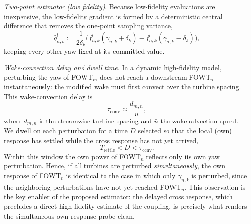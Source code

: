 \emph{Two-point estimator (low fidelity).} Because low-fidelity evaluations are inexpensive, the low-fidelity gradient is formed by a deterministic central difference that removes the one-point sampling variance,
\begin{equation} \label{eq:two-point}
    \hat{g}^{l}_{n,k} := \frac{1}{2\delta_k}\Big( f^{l}_{n,k}(\gamma_{n,k}+\delta_k) - f^{l}_{n,k}(\gamma_{n,k}-\delta_k) \Big),
\end{equation}
keeping every other yaw fixed at its committed value.

\emph{Wake-convection delay and dwell time.} In a dynamic high-fidelity model, perturbing the yaw of FOWT$_m$ does not reach a downstream FOWT$_n$ instantaneously: the modified wake must first convect over the turbine spacing. This wake-convection delay is
\begin{equation} \label{eq:tau-conv}
    \tau_{\text{conv}} \approx \frac{d_{m,n}}{\bar{u}},
\end{equation}
where $d_{m,n}$ is the streamwise turbine spacing and $\bar{u}$ the wake-advection speed. We dwell on each perturbation for a time $D$ selected so that the local (own) response has settled while the cross response has not yet arrived,
\begin{equation} \label{eq:dwell}
    T_{\text{settle}} < D < \tau_{\text{conv}}.
\end{equation}
Within this window the own power of FOWT$_n$ reflects only its own yaw perturbation. Hence, if all turbines are perturbed \emph{simultaneously}, the own response of FOWT$_n$ is identical to the case in which only $\gamma_{n,k}$ is perturbed, since the neighboring perturbations have not yet reached FOWT$_n$. This observation is the key enabler of the proposed estimator: the delayed cross response, which precludes a direct high-fidelity estimate of the coupling, is precisely what renders the simultaneous own-response probe clean.

